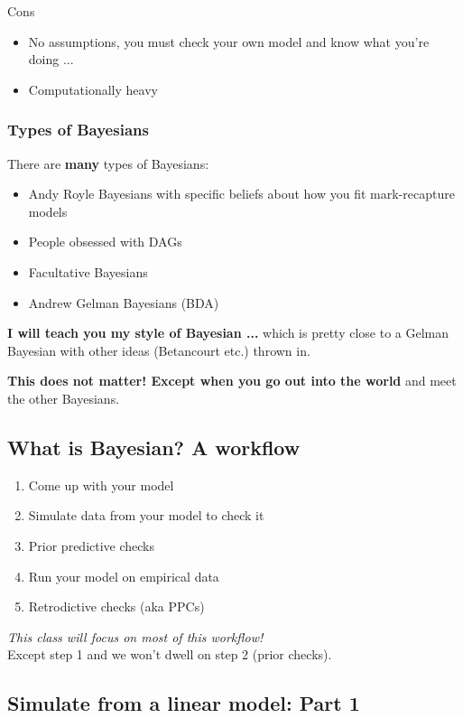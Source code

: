\documentclass[11pt]{article}
\begin{document}
Cons
\begin{itemize}
\item No assumptions, you must check your own model and know what you're doing ... 
\item Computationally heavy
\end{itemize}

\subsubsection{Types of Bayesians}
There are {\bf many} types of Bayesians:
\begin{itemize}
\item Andy Royle Bayesians with specific beliefs about how you fit mark-recapture models
\item People obsessed with DAGs
\item Facultative Bayesians
\item Andrew Gelman Bayesians (BDA)
\end{itemize}

{\bf I will teach you my style of Bayesian ...} which is pretty close to a Gelman Bayesian with other ideas (Betancourt etc.) thrown in. 

{\bf This does not matter! Except when you go out into the world} and meet the other Bayesians.

\subsection{What is Bayesian? A workflow}

\begin{enumerate}
\item Come up with your model
\item Simulate data from your model to check it
\item Prior predictive checks
\item Run your model on empirical data
\item Retrodictive checks (aka PPCs)
\end{enumerate}

\emph{This class will focus on most of this workflow!} \\Except step 1 and we won't dwell on step 2 (prior checks).

\subsection{Simulate from a linear model: Part 1}
\end{document}
